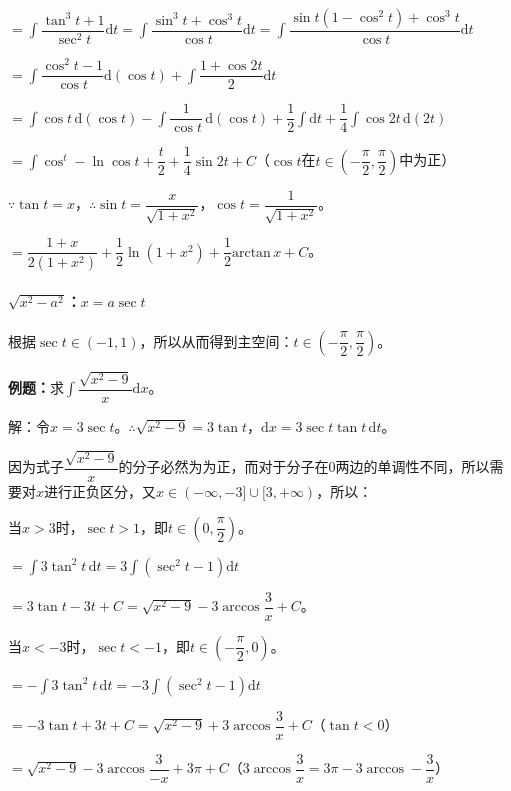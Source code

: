 \documentclass[UTF8, 12pt]{ctexart}
\begin{document}
$=\displaystyle{\int\dfrac{\tan^3t+1}{\sec^2t}\textrm{d}t=\int\dfrac{\sin^3t+\cos^3t}{\cos t}\textrm{d}t=\int\dfrac{\sin t(1-\cos^2t)+\cos^3t}{\cos t}\textrm{d}t}$

$=\displaystyle{\int\dfrac{\cos^2t-1}{\cos t}\textrm{d}(\cos t)+\int\dfrac{1+\cos2t}{2}\textrm{d}t}$

$=\displaystyle{\int\cos t\,\textrm{d}(\cos t)-\int\dfrac{1}{\cos t}\,\textrm{d}(\cos t)+\dfrac{1}{2}\int\textrm{d}t+\dfrac{1}{4}\int\cos2t\,\textrm{d}(2t)}$

$=\displaystyle{\int\cos^t-\ln\cos t+\dfrac{t}{2}+\dfrac{1}{4}\sin2t+C}$（$\cos t$在$t\in\left(-\dfrac{\pi}{2},\dfrac{\pi}{2}\right)$中为正）

$\because\tan t=x$，$\therefore\sin t=\dfrac{x}{\sqrt{1+x^2}}$，$\cos t=\dfrac{1}{\sqrt{1+x^2}}$。

$=\dfrac{1+x}{2(1+x^2)}+\dfrac{1}{2}\ln(1+x^2)+\dfrac{1}{2}\textrm{arctan}\,x+C$。

\paragraph{\texorpdfstring{$\sqrt{x^2-a^2}$：$x=a\sec t$}\ } \leavevmode \medskip

根据$\sec t\in(-1,1)$，所以从而得到主空间：$t\in\left(-\dfrac{\pi}{2},\dfrac{\pi}{2}\right)$。\medskip

\textbf{例题：}求$\displaystyle{\int\dfrac{\sqrt{x^2-9}}{x}\textrm{d}x}$。

解：令$x=3\sec t$。$\therefore\sqrt{x^2-9}=3\tan t$，$\textrm{d}x=3\sec t\tan t\,\textrm{d}t$。\medskip

因为式子$\dfrac{\sqrt{x^2-9}}{x}$的分子必然为为正，而对于分子在0两边的单调性不同，所以需要对$x$进行正负区分，又$x\in(-\infty,-3]\cup[3,+\infty)$，所以：

当$x>3$时，$\sec t>1$，即$t\in\left(0,\dfrac{\pi}{2}\right)$。

$=\displaystyle{\int3\tan^2t\,\textrm{d}t=3\int(\sec^2t-1)\textrm{d}t}$

$=3\tan t-3t+C=\sqrt{x^2-9}-3\arccos\dfrac{3}{x}+C$。

当$x<-3$时，$\sec t<-1$，即$t\in\left(-\dfrac{\pi}{2},0\right)$。

$=\displaystyle{-\int3\tan^2t\,\textrm{d}t=-3\int(\sec^2t-1)\textrm{d}t}$

$=-3\tan t+3t+C=\sqrt{x^2-9}+3\arccos\dfrac{3}{x}+C$（$\tan t<0$）

$=\sqrt{x^2-9}-3\arccos\dfrac{3}{-x}+3\pi+C$（$3\arccos\dfrac{3}{x}=3\pi-3\arccos-\dfrac{3}{x}$）
\end{document}

